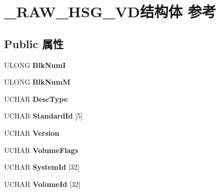 \hypertarget{struct___r_a_w___h_s_g___v_d}{}\section{\+\_\+\+R\+A\+W\+\_\+\+H\+S\+G\+\_\+\+V\+D结构体 参考}
\label{struct___r_a_w___h_s_g___v_d}
\subsection*{Public 属性}
\begin{DoxyCompactItemize}
\item 
\mbox{\label{struct___r_a_w___h_s_g___v_d_aedda9637f08a16ffab46e044af9e9f7d}} 
U\+L\+O\+NG {\bfseries Blk\+NumI}
\item 
\mbox{\label{struct___r_a_w___h_s_g___v_d_adc57c9d5cb458d8a5f2c01d156a76838}} 
U\+L\+O\+NG {\bfseries Blk\+NumM}
\item 
\mbox{\label{struct___r_a_w___h_s_g___v_d_ae4cef23fd997904250be9464dbba9ef5}} 
U\+C\+H\+AR {\bfseries Desc\+Type}
\item 
\mbox{\label{struct___r_a_w___h_s_g___v_d_a8652ea23ac1aff88c3cf5b4cfd740d33}} 
U\+C\+H\+AR {\bfseries Standard\+Id} \mbox{[}5\mbox{]}
\item 
\mbox{\label{struct___r_a_w___h_s_g___v_d_a02fb76688e8c5ef6a602c1c470cf0f5a}} 
U\+C\+H\+AR {\bfseries Version}
\item 
\mbox{\label{struct___r_a_w___h_s_g___v_d_ab61a5ac731a309e9492b682ec772a490}} 
U\+C\+H\+AR {\bfseries Volume\+Flags}
\item 
\mbox{\label{struct___r_a_w___h_s_g___v_d_aa6887a90b6a88f61a8fe7dd34b51d4fa}} 
U\+C\+H\+AR {\bfseries System\+Id} \mbox{[}32\mbox{]}
\item 
\mbox{\label{struct___r_a_w___h_s_g___v_d_a012487b65d3cc3529cb60c1cb9f78a59}} 
U\+C\+H\+AR {\bfseries Volume\+Id} \mbox{[}32\mbox{]}

\end{DoxyCompactItemize}
